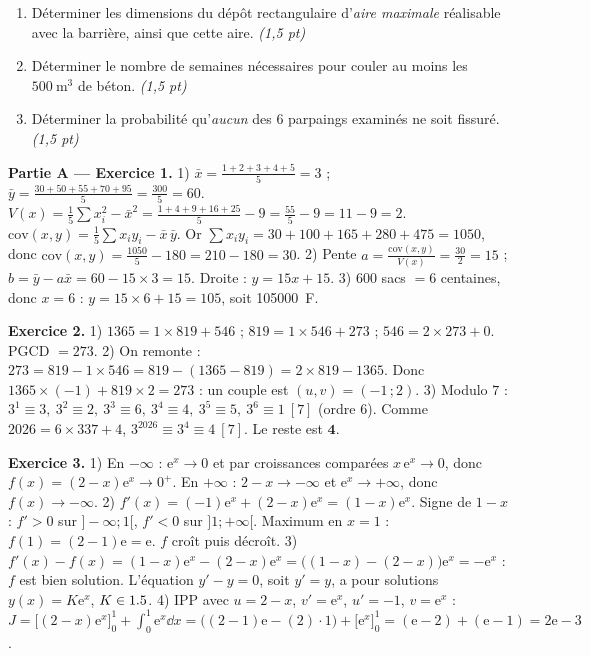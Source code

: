 \begin{enumerate}[label=\textbf{Tâche \arabic*.},leftmargin=2.4em]
\item Déterminer les dimensions du dépôt rectangulaire d'\emph{aire maximale} réalisable avec la
barrière, ainsi que cette aire. \hfill\textit{(1,5 pt)}
\item Déterminer le nombre de semaines nécessaires pour couler au moins les $\SI{500}{\cubic\metre}$ de béton. \hfill\textit{(1,5 pt)}
\item Déterminer la probabilité qu'\emph{aucun} des $6$ parpaings examinés ne soit fissuré. \hfill\textit{(1,5 pt)}
\end{enumerate}
\par{}


\noindent\textbf{Partie A — Exercice 1.}
1) $\bar x=\frac{1+2+3+4+5}{5}=3$ ; $\bar y=\frac{30+50+55+70+95}{5}=\frac{300}{5}=60$.
$V(x)=\frac15\sum x_i^2-\bar x^2=\frac{1+4+9+16+25}{5}-9=\frac{55}{5}-9=11-9=2$.
$\mathrm{cov}(x,y)=\frac15\sum x_iy_i-\bar x\,\bar y$. Or $\sum x_iy_i=30+100+165+280+475=1050$,
donc $\mathrm{cov}(x,y)=\frac{1050}{5}-180=210-180=30$.
2) Pente $a=\frac{\mathrm{cov}(x,y)}{V(x)}=\frac{30}{2}=15$ ; $b=\bar y-a\bar x=60-15\times3=15$.
Droite : $y=15x+15$.
3) $600$ sacs $=6$ centaines, donc $x=6$ : $y=15\times6+15=105$, soit \SI{105000}{F}.

\noindent\textbf{Exercice 2.}
1) $1365=1\times819+546$ ; $819=1\times546+273$ ; $546=2\times273+0$. PGCD $=273$.
2) On remonte : $273=819-1\times546=819-(1365-819)=2\times819-1365$. Donc
$1365\times(-1)+819\times2=273$ : un couple est $(u,v)=(-1\,;2)$.
3) Modulo $7$ : $3^1\equiv3,\ 3^2\equiv2,\ 3^3\equiv6,\ 3^4\equiv4,\ 3^5\equiv5,\ 3^6\equiv1\ [7]$
(ordre $6$). Comme $2026=6\times337+4$, $3^{2026}\equiv3^4\equiv4\ [7]$. Le reste est $\mathbf 4$.

\noindent\textbf{Exercice 3.}
1) En $-\infty$ : $\mathrm e^x\to0$ et par croissances comparées $x\,\mathrm e^x\to0$, donc $f(x)=(2-x)\mathrm e^x\to0^+$.
En $+\infty$ : $2-x\to-\infty$ et $\mathrm e^x\to+\infty$, donc $f(x)\to-\infty$.
2) $f'(x)=(-1)\mathrm e^x+(2-x)\mathrm e^x=(1-x)\mathrm e^x$. Signe de $1-x$ : $f'>0$ sur $]-\infty;1[$,
$f'<0$ sur $]1;+\infty[$. Maximum en $x=1$ : $f(1)=(2-1)\mathrm e=\mathrm e$. $f$ croît puis décroît.
3) $f'(x)-f(x)=(1-x)\mathrm e^x-(2-x)\mathrm e^x=\big((1-x)-(2-x)\big)\mathrm e^x=-\mathrm e^x$ : $f$ est bien solution.
L'équation $y'-y=0$, soit $y'=y$, a pour solutions $y(x)=K\mathrm e^{x}$, $K\in1.5$.
4) IPP avec $u=2-x$, $v'=\mathrm e^x$, $u'=-1$, $v=\mathrm e^x$ :
$J=\big[(2-x)\mathrm e^x\big]_0^1+\int_0^1\mathrm e^x\dd x=\big((2-1)\mathrm e-(2)\cdot1\big)+\big[\mathrm e^x\big]_0^1
=(\mathrm e-2)+(\mathrm e-1)=2\mathrm e-3$.

